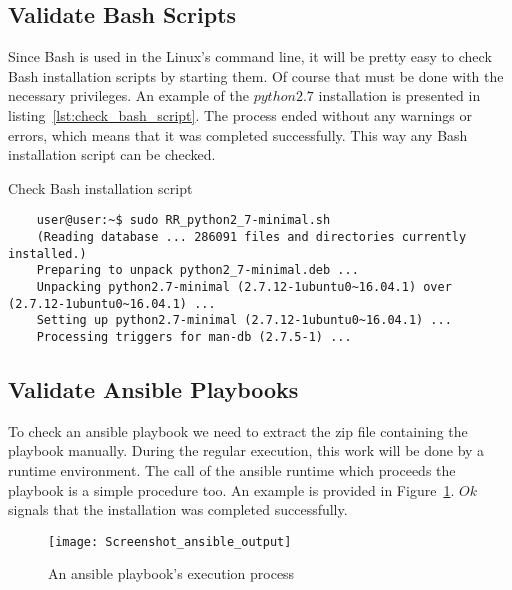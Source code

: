 \subsection*{Validate Bash Scripts}
Since Bash is used in the Linux's command line, it will be pretty easy to check Bash installation scripts by starting them.
Of course that must be done with the necessary privileges.
An example of the $python2.7$ installation is presented in listing~\ref{lst:check_bash_script}. %
The process ended without any warnings or errors, which means that it was completed successfully.
This way any Bash installation script can be checked.
\begin{Listing}
	\caption{Check Bash installation script}
	\label{lst:check_bash_script}
	\begin{lstlisting}
	user@user:~$ sudo RR_python2_7-minimal.sh 
	(Reading database ... 286091 files and directories currently installed.)
	Preparing to unpack python2_7-minimal.deb ...
	Unpacking python2.7-minimal (2.7.12-1ubuntu0~16.04.1) over (2.7.12-1ubuntu0~16.04.1) ...
	Setting up python2.7-minimal (2.7.12-1ubuntu0~16.04.1) ...
	Processing triggers for man-db (2.7.5-1) ...
	\end{lstlisting}
\end{Listing}

\subsection*{Validate Ansible Playbooks}
To check an ansible playbook we need to extract the zip file containing the playbook manually. 
During the regular execution, this work will be done by a runtime environment.
The call of the ansible runtime which proceeds the playbook is a simple procedure too.
An example is provided in Figure~\ref{fig:ansible_output2}. %
$Ok$ signals that the installation was completed successfully.
\begin{figure}[ht]   
	\centering
	\texttt{[image: Screenshot\_ansible\_output]}
	\caption{An ansible playbook's execution process}
	\label{fig:ansible_output2}
\end{figure}